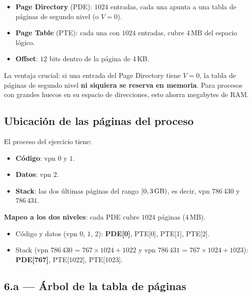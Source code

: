 \documentclass[11pt,a4paper]{article}
\begin{document}
\begin{itemize}[leftmargin=*,nosep]
    \item \textbf{Page Directory} (PDE): $1024$ entradas, cada una
        apunta a una tabla de páginas de segundo nivel (o $V=0$).
    \item \textbf{Page Table} (PTE): cada una con $1024$ entradas,
        cubre $4$\,MB del espacio lógico.
    \item \textbf{Offset}: $12$ bits dentro de la página de $4$\,KB.
\end{itemize}

\begin{idea}
La ventaja crucial: si una entrada del Page Directory tiene $V=0$, la
tabla de páginas de segundo nivel \textbf{ni siquiera se reserva en
memoria}. Para procesos con grandes huecos en su espacio de
direcciones, esto ahorra megabytes de RAM.
\end{idea}

\subsection{Ubicación de las páginas del proceso}

El proceso del ejercicio tiene:

\begin{itemize}[leftmargin=*,nosep]
    \item \textbf{Código}: vpn $0$ y $1$.
    \item \textbf{Datos}: vpn $2$.
    \item \textbf{Stack}: las dos últimas páginas del rango
        $[0, 3\text{\,GB})$, es decir, vpn $786\,430$ y $786\,431$.
\end{itemize}

\textbf{Mapeo a los dos niveles}: cada PDE cubre $1024$ páginas (4\,MB).

\begin{itemize}[leftmargin=*,nosep]
    \item Código y datos (vpn $0$, $1$, $2$): \textbf{PDE[0]}, PTE[0],
        PTE[1], PTE[2].
    \item Stack (vpn $786\,430$ = $767 \times 1024 + 1022$ y
        vpn $786\,431$ = $767 \times 1024 + 1023$): \textbf{PDE[767]},
        PTE[1022], PTE[1023].
\end{itemize}

\subsection{6.a --- Árbol de la tabla de páginas}
\end{document}
